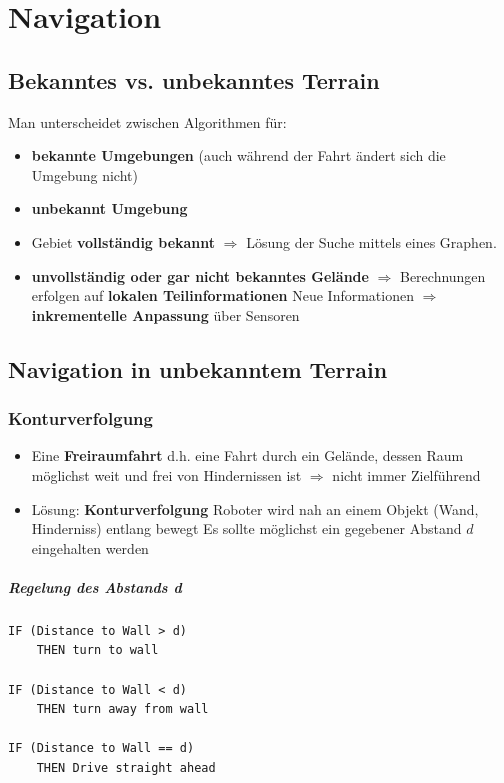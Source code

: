 \chapter{Navigation}
\section{Bekanntes vs. unbekanntes Terrain}
Man unterscheidet zwischen Algorithmen für:
\begin{itemize}
	\item \textbf{bekannte Umgebungen} (auch während der Fahrt ändert sich die Umgebung nicht)
	\item \textbf{unbekannt Umgebung}
\end{itemize}
\begin{itemize}
	\item Gebiet \textbf{vollständig bekannt} $\Rightarrow$ Lösung der Suche mittels eines Graphen.
	\item \textbf{unvollständig oder gar nicht bekanntes Gelände} $\Rightarrow$ Berechnungen erfolgen auf \textbf{lokalen Teilinformationen}
	\subitem Neue Informationen $\Rightarrow$ \textbf{inkrementelle Anpassung} über Sensoren
\end{itemize}
\section{Navigation in unbekanntem Terrain}
\subsection{Konturverfolgung}
\begin{itemize}
	\item Eine \textbf{Freiraumfahrt} d.h. eine Fahrt durch ein Gelände, dessen Raum möglichst weit und frei von Hindernissen ist $\Rightarrow$ nicht immer Zielführend
	\item Lösung: \textbf{Konturverfolgung}
	\subitem Roboter wird nah an einem Objekt (Wand, Hinderniss) entlang bewegt
	\subitem Es sollte möglichst ein gegebener Abstand $d$ eingehalten werden
\end{itemize}
\newpage
\paragraph{Regelung des Abstands d}
\begin{lstlisting}
IF (Distance to Wall > d) 
	THEN turn to wall

IF (Distance to Wall < d) 
	THEN turn away from wall

IF (Distance to Wall == d) 
	THEN Drive straight ahead
\end{lstlisting}
